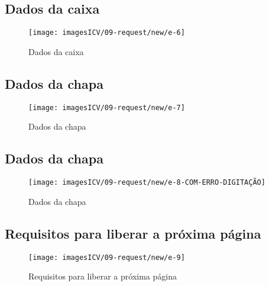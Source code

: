 \thispagestyle{fancy}
\vspace{\fill}
\subsection{\small Dados da caixa}
\begin{figure}
    \centering
    \texttt{[image: imagesICV/09-request/new/e-6]}
    \caption{Dados da caixa}
\end{figure}
\newpage

\thispagestyle{fancy}
\vspace{\fill}
\subsection{\small Dados da chapa}
\begin{figure}
    \centering
    \texttt{[image: imagesICV/09-request/new/e-7]}
    \caption{Dados da chapa}
\end{figure}
\newpage

\thispagestyle{fancy}
\vspace{\fill}
\subsection{\small Dados da chapa}
\begin{figure}
    \centering
    \texttt{[image: imagesICV/09-request/new/e-8-COM-ERRO-DIGITAÇÃO]}
    \caption{Dados da chapa}
\end{figure}
\newpage

\thispagestyle{fancy}
\vspace{\fill}
\subsection{\small Requisitos para liberar a próxima página}
\begin{figure}
    \centering
    \texttt{[image: imagesICV/09-request/new/e-9]}
    \caption{Requisitos para liberar a próxima página}
\end{figure}

